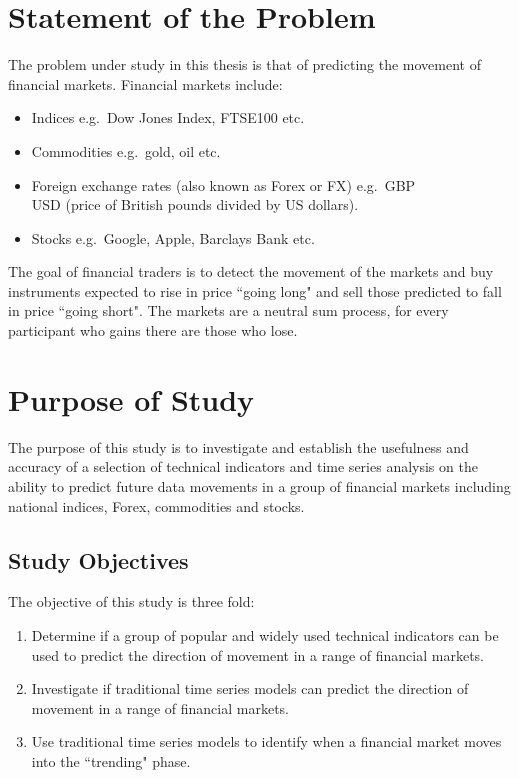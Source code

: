 

\section{Statement of the Problem}
The problem under study in this thesis is that of predicting the movement of financial markets. Financial markets include:
\begin{itemize}
\item Indices e.g.\ Dow Jones Index, FTSE100 etc.
\item Commodities e.g.\ gold, oil etc.
\item Foreign exchange rates (also known as Forex or FX) e.g.\ GBP\\USD (price of British pounds divided by US dollars).
\item Stocks e.g.\ Google, Apple, Barclays Bank etc.
\end{itemize}
The goal of financial traders is to detect the movement of the markets and buy instruments expected to rise in price \textquotedblleft going long" and sell those predicted to fall in price \textquotedblleft going short". The markets are a neutral sum process, for every participant who gains there are those who lose.

\section{Purpose of Study}
The purpose of this study is to investigate and establish the usefulness and accuracy of a selection of technical indicators and time series analysis on the ability to predict future data movements in a group of financial markets including national indices, Forex, commodities and stocks.

\subsection{Study Objectives}
The objective of this study is three fold:

\begin{enumerate}
\item Determine if a group of popular and widely used technical indicators can be used to predict the direction of movement in a range of financial markets.
\item Investigate if traditional time series models can predict the direction of movement in a range of financial markets.
\item Use traditional time series models to identify when a financial market moves into the \textquotedblleft trending" phase.
\end{enumerate}

